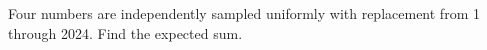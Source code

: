 Four numbers are independently sampled uniformly with replacement from 1 through 2024. Find the expected sum.
